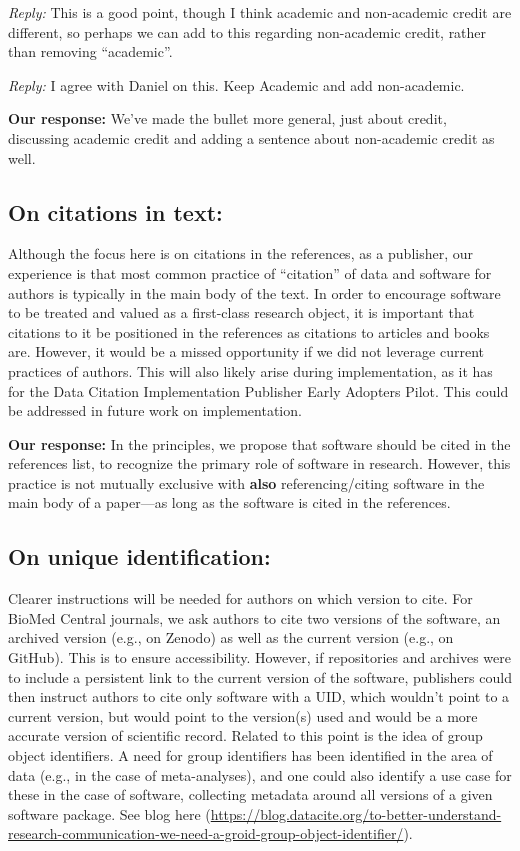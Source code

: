 \documentclass[12pt, oneside]{amsart}
\begin{document}
\emph{Reply:} This is a good point, though I think academic and non-academic credit are different, so perhaps we can add to this regarding non-academic credit, rather than removing ``academic''.

\emph{Reply:} I agree with Daniel on this. Keep Academic and add non-academic.

\textbf{Our response:} We've made the bullet more general, just about credit, discussing academic credit and adding a sentence about non-academic credit as well.

\subsection{On citations in text:} Although the focus here is on citations in the references, as a publisher, our experience is that most common practice of ``citation'' of data and software for authors is typically in the main body of the text. In order to encourage software to be treated and valued as a first-class research object, it is important that citations to it be positioned in the references as citations to articles and books are. However, it would be a missed opportunity if we did not leverage current practices of authors. This will also likely arise during implementation, as it has for the Data Citation Implementation Publisher Early Adopters Pilot. This could be addressed in future work on implementation.

\textbf{Our response:} In the principles, we propose that software should be cited in the references list, to recognize the primary role of software in research. However, this practice is not mutually exclusive with \textbf{also} referencing\slash citing software in the main body of a paper---as long as the software is cited in the references.

\subsection{On unique identification:} Clearer instructions will be needed for authors on which version to cite. For BioMed Central journals, we ask authors to cite two versions of the software, an archived version (e.g., on Zenodo) as well as the current version (e.g., on GitHub). This is to ensure accessibility. However, if repositories and archives were to include a persistent link to the current version of the software, publishers could then instruct authors to cite only software with a UID, which wouldn't point to a current version, but would point to the version(s) used and would be a more accurate version of scientific record. Related to this point is the idea of group object identifiers. A need for group identifiers has been identified in the area of data (e.g., in the case of meta-analyses), and one could also identify a use case for these in the case of software, collecting metadata around all versions of a given software package. See blog here (\url{https://blog.datacite.org/to-better-understand-research-communication-we-need-a-groid-group-object-identifier/}).
\end{document}
